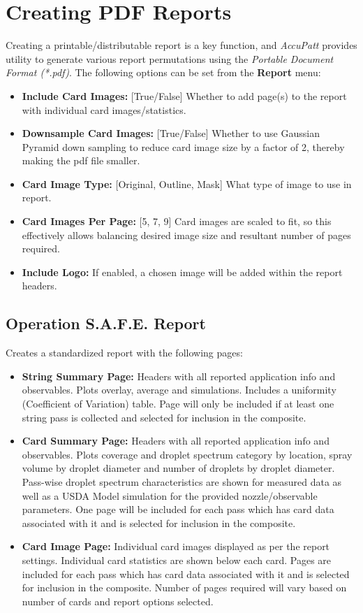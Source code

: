 \documentclass[10pt,letterpaper,titlepage]{article}
\begin{document}
    \newpage

    \section{Creating PDF Reports}
    Creating a printable/distributable report is a key function, and \textit{AccuPatt} provides utility to generate various report permutations using the \textit{Portable Document Format (*.pdf)}. The following options can be set from the \textbf{Report} menu:
    \begin{itemize}
        \item \textbf{Include Card Images:} [True/False] Whether to add page(s) to the report with individual card images/statistics.
        \item \textbf{Downsample Card Images:} [True/False] Whether to use Gaussian Pyramid down sampling to reduce card image size by a factor of 2, thereby making the pdf file smaller.
        \item \textbf{Card Image Type:} [Original, Outline, Mask] What type of image to use in report.
        \item \textbf{Card Images Per Page:} [5, 7, 9] Card images are scaled to fit, so this effectively allows balancing desired image size and resultant number of pages required.
        \item \textbf{Include Logo:} If enabled, a chosen image will be added within the report headers.
    \end{itemize}

    \subsection{Operation S.A.F.E. Report}
    Creates a standardized report with the following pages:
    \begin{itemize}
        \item \textbf{String Summary Page:} Headers with all reported application info and observables. Plots overlay, average and simulations. Includes a uniformity (Coefficient of Variation) table. Page will only be included if at least one string pass is collected and selected for inclusion in the composite.
        \item \textbf{Card Summary Page:} Headers with all reported application info and observables. Plots coverage and droplet spectrum category by location, spray volume by droplet diameter and number of droplets by droplet diameter. Pass-wise droplet spectrum characteristics are shown for measured data as well as a USDA Model simulation for the provided nozzle/observable parameters. One page will be included for each pass which has card data associated with it and is selected for inclusion in the composite.
        \item \textbf{Card Image Page:} Individual card images displayed as per the report settings. Individual card statistics are shown below each card. Pages are included for each pass which has card data associated with it and is selected for inclusion in the composite. Number of pages required will vary based on number of cards and report options selected.
    \end{itemize}
    \newpage
\end{document}
